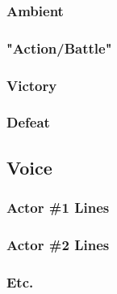 \subsubsection{Ambient}

\subsubsection{"Action/Battle"}

\subsubsection{Victory}

\subsubsection{Defeat}

\subsection{Voice}

\subsubsection{Actor \#1 Lines}

\subsubsection{Actor \#2 Lines}

\subsubsection{Etc.}

\newpage